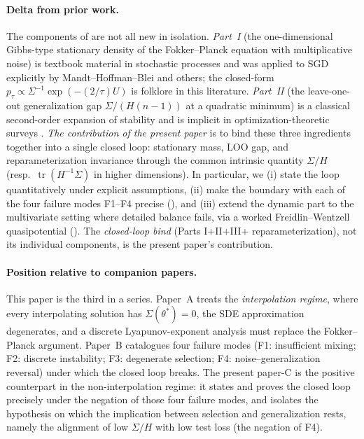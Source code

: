 \documentclass[11pt,a4paper]{article}
\theoremstyle{definition}
\theoremstyle{remark}
\DeclareMathOperator{\tr}{tr}
\begin{document}
\paragraph{Delta from prior work.}
The components of  are not all new in isolation.
\emph{Part~I} (the one-dimensional Gibbs-type stationary density of the
Fokker--Planck equation with multiplicative noise) is textbook material
in stochastic processes \cite{Pavliotis2014} and was applied to SGD
explicitly by Mandt--Hoffman--Blei \cite[\S3]{MandtHoffmanBlei2017} and
others; the closed-form
$p_\tau\propto\Sigma^{-1}\exp(-(2/\tau)U)$ is folklore in this
literature.  \emph{Part~II} (the leave-one-out generalization gap
$\Sigma/(H(n-1))$ at a quadratic minimum) is a classical second-order
expansion of stability \cite{BousquetElisseeff2002} and is implicit in
optimization-theoretic surveys \cite{BottouCurtisNocedal2018}.
\emph{The contribution of the present paper} is to bind these three
ingredients together into a single closed loop: stationary mass,
LOO gap, and reparameterization invariance through the common
intrinsic quantity $\Sigma/H$ (resp.\ $\tr(H^{-1}\Sigma)$ in higher
dimensions).  In particular, we (i) state the loop quantitatively
under explicit assumptions, (ii) make the boundary with each of the
four failure modes F1--F4 precise (), and (iii)
extend the dynamic part to the multivariate setting where detailed
balance fails, via a worked Freidlin--Wentzell quasipotential
().  The \emph{closed-loop bind} (Parts I+II+III+
reparameterization), not its individual components, is the present
paper's contribution.

\paragraph{Position relative to companion papers.}
This paper is the third in a series.  Paper~A \cite{paperA} treats the
\emph{interpolation regime}, where every interpolating solution has
$\Sigma(\theta^*)=0$, the SDE approximation degenerates, and a discrete
Lyapunov-exponent analysis must replace the Fokker--Planck argument.
Paper~B \cite{paperB} catalogues four failure modes (F1: insufficient
mixing; F2: discrete instability; F3: degenerate selection; F4:
noise--generalization reversal) under which the closed loop breaks.  The
present paper-C is the positive counterpart in the non-interpolation regime:
it states and proves the closed loop precisely under the negation of those
four failure modes, and isolates the hypothesis on which the implication
between selection and generalization rests, namely the alignment of low
$\Sigma/H$ with low test loss (the negation of F4).
\end{document}

